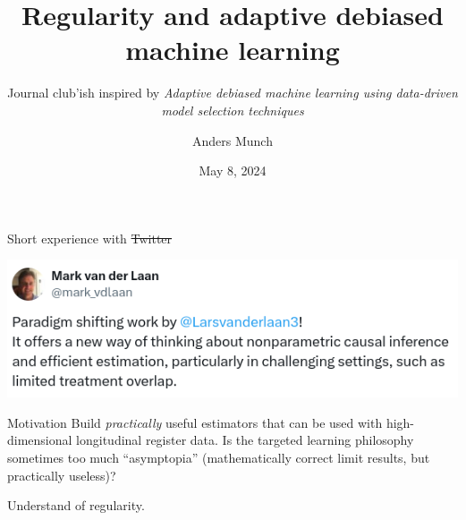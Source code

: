 \documentclass[smaller]{beamer}\usepackage{listings}
\author{Anders Munch}
\date{May 8, 2024}
\title{Regularity and adaptive debiased machine learning \newline}
\subtitle{Journal club'ish inspired by \newline \emph{Adaptive debiased machine learning using data-driven model selection techniques} \citep*{van2023adaptive}}
\newcommand{\1}{\mathds{1}}
\begin{document}
\maketitle

\begin{frame}[label={sec:org413e683}]{Short experience with \sout{Twitter}}
\begin{center}
\includegraphics[width=1\textwidth]{./twitter-laan-quote.png}
\end{center}
\end{frame}

\begin{frame}[label={sec:org4582758}]{Motivation}
Build \emph{practically} useful estimators that can be used with high-dimensional
longitudinal register data. Is the targeted learning philosophy sometimes too
much ``asymptopia'' (mathematically correct limit results, but practically
useless)?

\vfill

Understand of regularity.
\end{frame}
\end{document}

